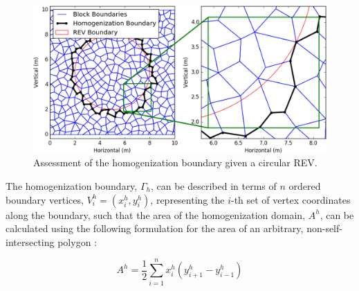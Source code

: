 \begin{figure}[!tbp]
\begin{center}
\includegraphics[width=\textwidth]{figures/homogenizationarea/homoarea}
\caption{{\label{fig:homoarea}Assessment of the homogenization boundary given a circular REV.%
}}
\end{center}
\end{figure}


The homogenization boundary, $\Gamma_{h}$, can be described in terms of $n$ ordered boundary vertices, $V_{i}^{h}=(x_{i}^{h},y_{i}^{h})$, representing the $i$-th set of vertex coordinates along the boundary, such that the area of the homogenization domain, $A^{h}$, can be calculated using the following formulation for the area of an arbitrary, non-self-intersecting polygon \citep{Zwillinger_1995}: 

\begin{equation}
A^{h}=\dfrac{1}{2}\sum_{i=1}^{n}x_{i}^{h}(y_{i+1}^{h}-y_{i-1}^{h})
\label{eqn:hom1}
\end{equation}

